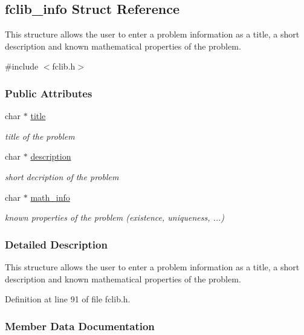 \hypertarget{structfclib__info}{}\subsection{fclib\+\_\+info Struct Reference}
\label{structfclib__info}


This structure allows the user to enter a problem information as a title, a short description and known mathematical properties of the problem.  




{\ttfamily \#include $<$fclib.\+h$>$}

\subsubsection*{Public Attributes}
\begin{DoxyCompactItemize}
\item 
char $\ast$ \hyperlink{structfclib__info_a4ea1b298e3aa7228a5f2a55f711f41d2}{title}
\begin{DoxyCompactList}\small\item\em title of the problem \end{DoxyCompactList}\item 
char $\ast$ \hyperlink{structfclib__info_a0c1680fee67eaf7b20c436a775d4f35d}{description}
\begin{DoxyCompactList}\small\item\em short decription of the problem \end{DoxyCompactList}\item 
char $\ast$ \hyperlink{structfclib__info_ad6dadb3af34a719e5ec3cab2d499c7f2}{math\+\_\+info}
\begin{DoxyCompactList}\small\item\em known properties of the problem (existence, uniqueness, ...) \end{DoxyCompactList}\end{DoxyCompactItemize}


\subsubsection{Detailed Description}
This structure allows the user to enter a problem information as a title, a short description and known mathematical properties of the problem. 

Definition at line 91 of file fclib.\+h.



\subsubsection{Member Data Documentation}
\hypertarget{structfclib__info_a4ea1b298e3aa7228a5f2a55f711f41d2}{}
